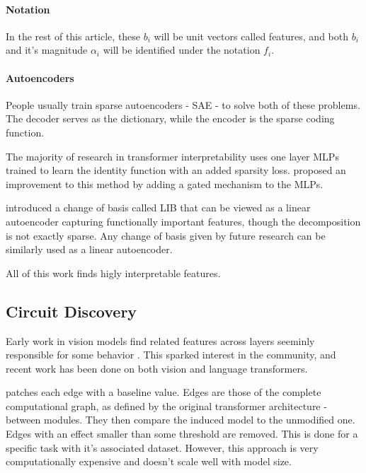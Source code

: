 \documentclass{article}
\begin{document}
\paragraph{Notation} In the rest of this article, these $b_i$ will be unit vectors called features, and both $b_i$ and it's magnitude $\alpha_i$ will be identified under the notation $f_i$.

\paragraph{Autoencoders} People usually train sparse autoencoders - SAE - \citep{ng2011sparse} to solve both of these problems. The decoder serves as the dictionary, while the encoder is the sparse coding function.

The majority of research in transformer interpretability uses one layer MLPs \citep{cunningham2023sparse, gao2024scaling} trained to learn the identity function with an added sparsity loss. \citet{rajamanoharan2024improving} proposed an improvement to this method by adding a gated mechanism to the MLPs.

\citet{bushnaq2024using} introduced a change of basis called LIB that can be viewed as a linear autoencoder capturing functionally important features, though the decomposition is not exactly sparse. Any change of basis given by future research can be similarly used as a linear autoencoder.%

All of this work finds higly interpretable features.

\subsection{Circuit Discovery}

Early work in vision models find related features across layers seeminly responsible for some behavior \citep{olah2020zoomCircuits}. This sparked interest in the community, and recent work has been done on both vision and language transformers.

\citet{conmy2023automatedACDCCircuits} patches each edge with a baseline value. Edges are those of the complete computational graph, as defined by the original transformer architecture - between modules. They then compare the induced model to the unmodified one. Edges with an effect smaller than some threshold are removed. This is done for a specific task with it's associated dataset. However, this approach is very computationally expensive and doesn't scale well with model size.
\end{document}
